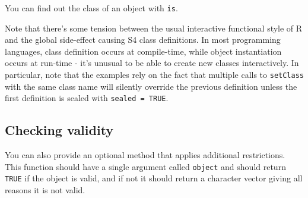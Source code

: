 You can find out the class of an object with \texttt{is}.

Note that there's some tension between the usual interactive functional
style of R and the global side-effect causing S4 class definitions. In
most programming languages, class definition occurs at compile-time,
while object instantiation occurs at run-time - it's unusual to be able
to create new classes interactively. In particular, note that the
examples rely on the fact that multiple calls to \texttt{setClass} with
the same class name will silently override the previous definition
unless the first definition is sealed with \texttt{sealed\ =\ TRUE}.

\hypertarget{checking-validity}{%
\subsection{Checking validity}\label{checking-validity}}

You can also provide an optional method that applies additional
restrictions. This function should have a single argument called
\texttt{object} and should return \texttt{TRUE} if the object is valid,
and if not it should return a character vector giving all reasons it is
not valid.

